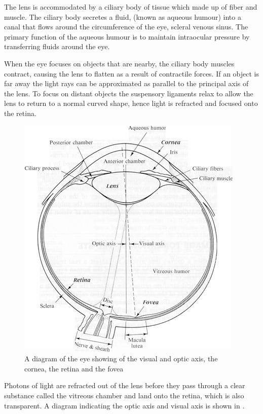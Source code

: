 The lens is accommodated by a ciliary body of tissue which made up of fiber and
muscle. The ciliary body secretes a fluid, (known as aqueous humour) into a canal
that flows around the circumference of the eye, scleral venous sinus.
\cite{bill1970effects,dvorak1934schlemm} The primary function of the aqueous humour
is to maintain intraocular pressure by transferring fluids around the eye.

When the eye focuses on objects that are nearby, the ciliary body muscles contract,
causing the lens to flatten as a result of contractile forces. If an object is far
away the light rays can be approximated as parallel to the principal axis of the lens.
To focus on distant objects the suspensory ligaments relax to allow the lens to return
to a normal curved shape, hence light is refracted and focused onto the retina.

\begin{figure}[!htbp]
\centering
  \includegraphics{figures/eye_diagram}
\caption{A diagram of the eye showing of the visual
 and optic axis, the cornea, the retina and the fovea}
\label{fig:optic_axis}
\end{figure}

Photons of light are refracted out of the lens before they pass through
a clear substance called the vitreous chamber and land onto the retina,
which is also transparent. A diagram indicating the optic axis and
visual axis is shown in .

